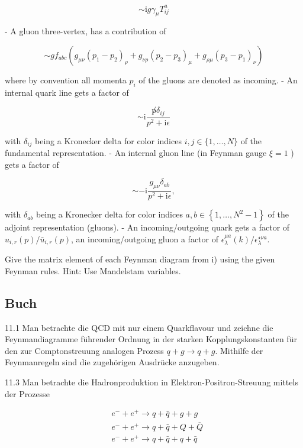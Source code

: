 \documentclass[10pt, letterpaper]{article}
\begin{document}
$$
\sim \mathrm{i} g \gamma_\mu T_{i j}^a
$$

- A gluon three-vertex, has a contribution of

$$
\sim g f_{a b c}\left(g_{\mu \nu}\left(p_1-p_2\right)_\rho+g_{\nu \rho}\left(p_2-p_3\right)_\mu+g_{\rho \mu}\left(p_3-p_1\right)_\nu\right)
$$

where by convention all momenta $p_i$ of the gluons are denoted as incoming.
- An internal quark line gets a factor of

$$
\sim \mathrm{i} \frac{\not p \delta_{i j}}{p^2+\mathrm{i} \epsilon}
$$

with $\delta_{i j}$ being a Kronecker delta for color indices $i, j \in\{1, \ldots, N\}$ of the fundamental representation.
- An internal gluon line (in Feynman gauge $\xi=1$ ) gets a factor of

$$
\sim-\mathrm{i} \frac{g_{\mu \nu} \delta_{a b}}{p^2+\mathrm{i} \epsilon},
$$

with $\delta_{a b}$ being a Kronecker delta for color indices $a, b \in\left\{1, \ldots, N^2-1\right\}$ of the adjoint representation (gluons).
- An incoming/outgoing quark gets a factor of $u_{i, r}(p) / \bar{u}_{i, r}(p)$, an incoming/outgoing gluon a factor of $\epsilon_\lambda^{\mu a}(k) / \epsilon_\lambda^{\star \nu a}$.

Give the matrix element of each Feynman diagram from i) using the given Feynman rules. Hint: Use Mandelstam variables.


\pagebreak

\subsection{Buch}

11.1 Man betrachte die QCD mit nur einem Quarkflavour und zeichne die Feynmandiagramme führender Ordnung in der starken Kopplungskonstanten für den zur Comptonstreuung analogen Prozess $q+g \longrightarrow q+g$. Mithilfe der Feynmanregeln sind die zugehörigen Ausdrücke anzugeben.


11.3 Man betrachte die Hadronproduktion in Elektron-Positron-Streuung mittels der Prozesse

$$
\begin{aligned}
& e^{-}+e^{+} \longrightarrow q+\bar{q}+g+g \\
& e^{-}+e^{+} \longrightarrow q+\bar{q}+Q+\bar{Q} \\
& e^{-}+e^{+} \longrightarrow q+\bar{q}+q+\bar{q}
\end{aligned}
$$
\end{document}
